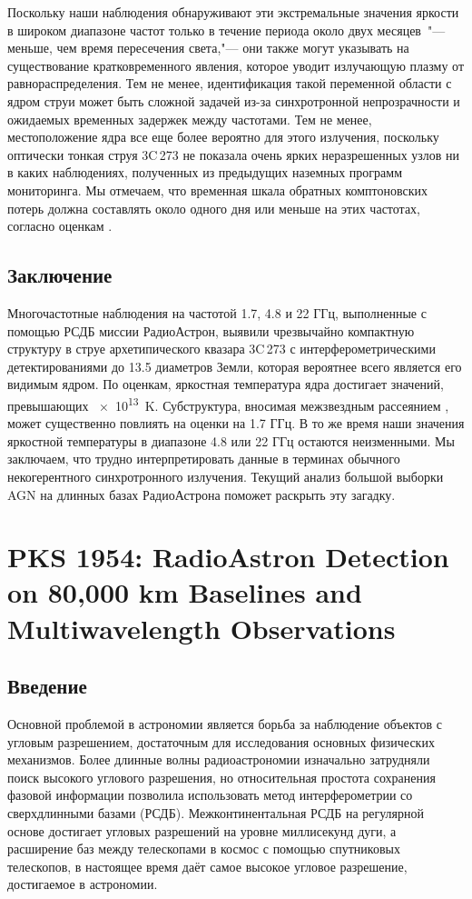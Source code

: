 Поскольку наши наблюдения обнаруживают эти экстремальные значения яркости в широком диапазоне
частот только в течение периода около двух месяцев~"--- меньше, чем время пересечения света,"---
они также могут указывать на существование кратковременного явления, которое уводит излучающую
плазму от равнораспределения. Тем не менее, идентификация такой переменной области с ядром струи
может быть сложной задачей из-за синхротронной непрозрачности и ожидаемых временных задержек между
частотами. Тем не менее, местоположение ядра все еще более вероятно для этого излучения, поскольку
оптически тонкая струя 3C\,273 не показала очень ярких неразрешенных узлов ни в каких наблюдениях,
полученных из предыдущих наземных программ мониторинга. Мы отмечаем, что временная шкала
обратных комптоновских потерь должна составлять около одного дня или меньше на этих частотах,
согласно оценкам \cite{Slysh_1992,Readhead_1994}.

\subsection{Заключение}

Многочастотные наблюдения на частотой 1.7, 4.8 и 22 ГГц, выполненные с помощью РСДБ миссии
РадиоАстрон, выявили чрезвычайно компактную структуру в струе архетипического квазара 3C\,273 с
интерферометрическими детектированиями до 13.5 диаметров Земли, которая вероятнее всего является
его видимым ядром. По оценкам, яркостная температура ядра достигает значений, превышающих
\SI{e13}{\kelvin}. Субструктура, вносимая межзвездным рассеянием \cite{Johnson_2016}, может
существенно повлиять на оценки на 1.7 ГГц. В то же время наши значения яркостной температуры в
диапазоне 4.8 или 22 ГГц остаются неизменными. Мы заключаем, что трудно интерпретировать данные в
терминах обычного некогерентного синхротронного излучения. Текущий анализ большой выборки AGN на
длинных базах РадиоАстрона поможет раскрыть эту загадку.


\section{PKS 1954: RadioAstron Detection on 80,000 km Baselines and
Multiwavelength Observations}

\subsection{Введение}

Основной проблемой в астрономии является борьба за наблюдение объектов с угловым разрешением,
достаточным для исследования основных физических механизмов. Более длинные волны радиоастрономии
изначально затрудняли поиск высокого углового разрешения, но относительная простота сохранения
фазовой информации позволила использовать метод интерферометрии со сверхдлинными базами (РСДБ).
Межконтинентальная РСДБ на регулярной основе достигает угловых разрешений на уровне миллисекунд
дуги, а расширение баз между телескопами в космос с помощью спутниковых телескопов, в настоящее
время даёт самое высокое угловое разрешение, достигаемое в астрономии.


